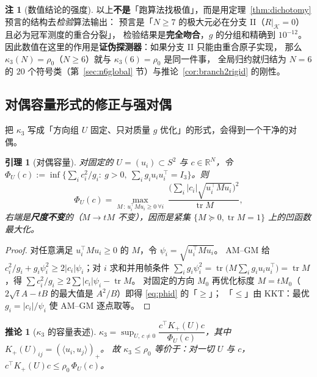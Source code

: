 \documentclass[UTF8,11pt]{ctexart}
\newtheorem{lemma}[theorem]{引理}
\newtheorem{corollary}[theorem]{推论}
\theoremstyle{definition}
\newtheorem{remark}[theorem]{注}
\newcommand{\tr}{\operatorname{tr}}
\newcommand{\R}{\mathbb{R}}
\begin{document}
\begin{remark}[数值结论的强度]\label{rmk:numstrength}
以上\textbf{不是}「跑算法找极值」，而是用定理~\ref{thm:dichotomy} 预言的结构去\emph{检验}算法输出：
预言是「$N\ge7$ 的极大元必在分支 II（$R|_{\mathcal K}=0$）且必为冠军测度的重合分裂」，
检验结果是\textbf{完全吻合}，$g$ 的分组和精确到 $10^{-12}$。
因此数值在这里的作用是\textbf{证伪探测器}：如果分支 II 只能由重合原子实现，
那么 $\kappa_3(N)=\rho_0$（$N\ge6$）就与 $\kappa_3(6)=\rho_0$ 是同一件事，
全局归约就归结为 $N=6$ 的 $20$ 个符号类（第~\ref{sec:n6global} 节）与推论~\ref{cor:branch2rigid} 的刚性。
\end{remark}


\subsection{对偶容量形式的修正与强对偶}\label{sec:r17:dual}

把 $\kappa_3$ 写成「方向组 $U$ 固定、只对质量 $g$ 优化」的形式，会得到一个干净的对偶。

\begin{lemma}[对偶容量]\label{lem:phid}
对固定的 $U=(u_i)\subset S^2$ 与 $c\in\R^N$，令
$\Phi_U(c):=\inf\bigl\{\sum_ic_i^2/g_i:\ g>0,\ \sum_ig_iu_iu_i^\top=I_3\bigr\}$。则
\begin{equation}\label{eq:phid}
\Phi_U(c)=\max_{M\,:\,u_i^\top Mu_i\ge0\ \forall i}\ \frac{\bigl(\sum_i|c_i|\sqrt{u_i^\top Mu_i}\bigr)^2}{\tr M},
\end{equation}
右端是\textbf{尺度不变}的（$M\to tM$ 不变），因而是紧集 $\{M\succeq0,\tr M=1\}$ 上的凹函数最大化。
\end{lemma}

\begin{proof}
对任意满足 $u_i^\top Mu_i\ge0$ 的 $M$，令 $\psi_i=\sqrt{u_i^\top Mu_i}$。
AM--GM 给 $c_i^2/g_i+g_i\psi_i^2\ge2|c_i|\psi_i$；对 $i$ 求和并用帧条件
$\sum_ig_i\psi_i^2=\tr\bigl(M\sum_ig_iu_iu_i^\top\bigr)=\tr M$，得
$\sum c_i^2/g_i\ge2\sum|c_i|\psi_i-\tr M$。
对固定的方向 $M_0$ 再优化标度 $M=tM_0$（$2\sqrt tA-tB$ 的最大值是 $A^2/B$）即得 \eqref{eq:phid} 的「$\ge$」；
「$\le$」由 KKT：最优 $g_i=|c_i|/\psi_i$ 使 AM--GM 逐点取等。
\end{proof}

\begin{corollary}[$\kappa_3$ 的容量表述]\label{cor:phikappa}
$\kappa_3=\sup_{U,\,c\ne0}\dfrac{c^\top K_+(U)c}{\Phi_U(c)}$，其中 $K_+(U)_{ij}=(\langle u_i,u_j\rangle)_+$。
故 $\kappa_3\le\rho_0$ 等价于：对一切 $U$ 与 $c$，$c^\top K_+(U)c\le\rho_0\,\Phi_U(c)$。
\end{corollary}
\end{document}
